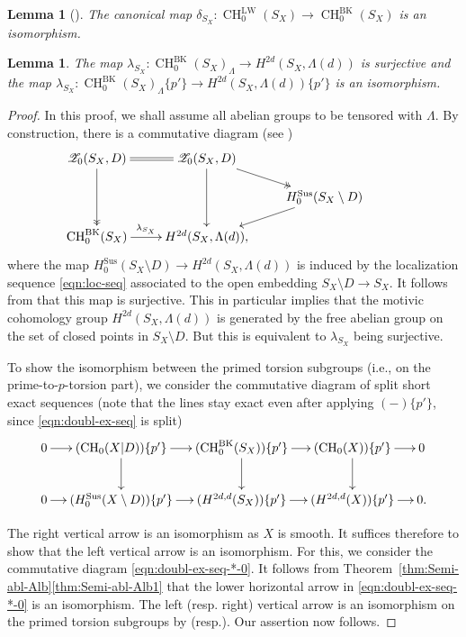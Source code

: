 \documentclass[11pt]{article}
\newcommand{\resp}{resp.\xspace}
\numberwithin{equation}{section}
\let\mathcal\mathscr
\newcommand{\BK}{\mathrm{BK}}
\newcommand{\LW}{\mathrm{LW}}
\newcommand{\sus}{\mathrm{Sus}}
\newtheorem{lem}[thm]{Lemma}
\theoremstyle{definition}
\newcommand{\thmref}{Theorem~\ref}
\newcommand{\sZ}{{\mathcal Z}}
\DeclareMathOperator{\CH}{CH}
\begin{document}
\begin{lem}[{\cite[Th.\,6.5]{Krishna-2}}]\label{lem:LW-lci*}
The canonical map $\delta_{S_X} \colon \CH^{\LW}_0(S_X) \to \CH_0^{\BK}(S_X)$ is an
isomorphism.
\end{lem}

\begin{lem}\label{lem:LW-MC}
The map $\lambda_{S_X}\colon \CH_0^{\BK}(S_X)_\Lambda \to H^{2d}(S_X, \Lambda(d))$ is
surjective and the map $\lambda_{S_X}\colon \CH_0^{\BK}(S_X)_\Lambda\{p'\} \to
H^{2d}(S_X, \Lambda(d))\{p'\}$ is an isomorphism.
\end{lem}
\begin{proof}
In this proof, we shall assume all abelian groups to be tensored with
$\Lambda$.
By construction, there is a commutative diagram (see \cite[(8.13)]{KP})
\begin{equation}\label{eqn:LW-MC-0}
\begin{array}{c}
\xymatrix@R=.5cm{
\sZ_0(S_X,D) \ar@{=}[r] \ar@{->>}[dd] & \sZ_0(S_X,D) \ar@{->>}[dr] \ar[dd]
& & \\
& & H^{\sus}_0(S_X \setminus D) \ar[dl] \\
\CH_0^{\BK}(S_X) \ar[r]^-{\lambda_{S_X}} & H^{2d}(S_X, \Lambda(d)),}
\end{array}
\end{equation}
where the map $H^{\sus}_0(S_X \setminus D) \to H^{2d}(S_X, \Lambda(d))$ is induced by the localization \hbox{sequence} \eqref{eqn:loc-seq} associated to the open embedding $S_X\setminus D\to S_X$.
It follows from \hbox{\cite[Th.\,5.1]{KP}} that this map is
surjective. This in particular implies that the motivic cohomology group $H^{2d}(S_X, \Lambda(d))$ is generated by the free abelian group on the set of closed points in $S_X\setminus D$. But this is equivalent to $\lambda_{S_X}$ being
surjective.

To show the isomorphism between the primed torsion subgroups
(i.e., on the prime-to-$p$-torsion part), we consider the
commutative diagram of split short exact sequences (note that the lines stay
exact even after applying $(-)\{p'\}$, since \eqref{eqn:doubl-ex-seq} is split)
\begin{equation}\label{eqn:LW-MC-1}
\begin{array}{c}
\xymatrix@C1pc{
0 \ar[r] & (\CH_0(X|D))\{p'\} \ar[r] \ar[d] & (\CH_0^{\BK}(S_X))\{p'\}
\ar[r] \ar[d] & (\CH_0(X))\{p'\} \ar[r] \ar[d] & 0 \\
0 \ar[r] & (H^{\sus}_0(X \setminus D))\{p'\} \ar[r] & (H^{2d,d}(S_X))\{p'\} \ar[r] &
(H^{2d,d}(X))\{p'\} \ar[r] & 0.}
\end{array}
\end{equation}

The right vertical arrow is an isomorphism as $X$ is smooth. It suffices
therefore to show that the left vertical arrow is an isomorphism.
For this, we consider the commutative diagram \eqref{eqn:doubl-ex-seq-*-0}.
It follows from \thmref{thm:Semi-abl-Alb}\eqref{thm:Semi-abl-Alb1} that the lower horizontal arrow
in \eqref{eqn:doubl-ex-seq-*-0} is an isomorphism. The left (\resp right) vertical
arrow is an isomorphism on the primed torsion subgroups by
\cite[Th.\,11.5]{BK} (\resp \cite[Th.\,1.1]{SS}). Our assertion now
follows.
\end{proof}
\end{document}
